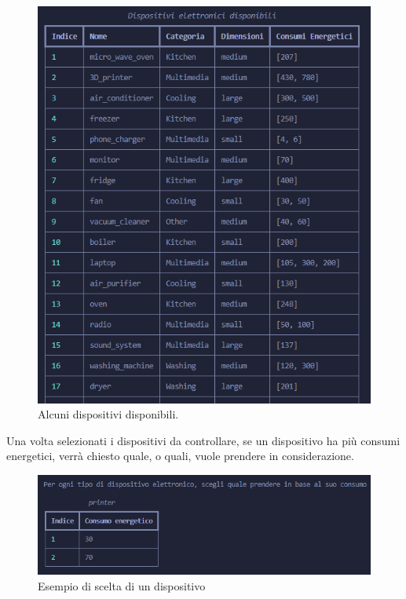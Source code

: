 \documentclass[12pt, letterpaper]{article}
\begin{document}
\begin{figure}[h]
      \centering
      \includegraphics[scale=0.7]{dispositivi-tabella.png}
      \caption{Alcuni dispositivi disponibili.}
\end{figure}


\noindent Una volta selezionati i dispositivi da controllare, se un dispositivo ha più consumi energetici,
verrà chiesto quale, o quali, vuole prendere in considerazione. \\

\begin{figure}[h]
      \centering
      \includegraphics[scale=0.7]{printer-choose.png}
      \caption{Esempio di scelta di un dispositivo}
\end{figure}
\end{document}
